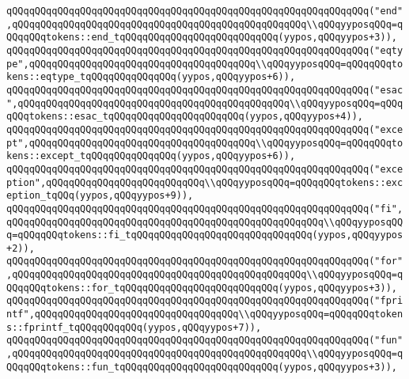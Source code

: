\verb|qQQqqQQqqQQqqQQqqQQqqQQqqQQqqQQqqQQqqQQqqQQqqQQqqQQqqQQqqQQqqQQq("end",qQQqqQQqqQQqqQQqqQQqqQQqqQQqqQQqqQQqqQQqqQQqqQQqqQQq\\qQQqyyposqQQq=qQQqqQQqtokens::end_tqQQqqQQqqQQqqQQqqQQqqQQqqQQq(yypos,qQQqyypos+3)),|\newline
\verb|qQQqqQQqqQQqqQQqqQQqqQQqqQQqqQQqqQQqqQQqqQQqqQQqqQQqqQQqqQQqqQQq("eqtype",qQQqqQQqqQQqqQQqqQQqqQQqqQQqqQQqqQQqqQQq\\qQQqyyposqQQq=qQQqqQQqtokens::eqtype_tqQQqqQQqqQQqqQQq(yypos,qQQqyypos+6)),|\newline
\verb|qQQqqQQqqQQqqQQqqQQqqQQqqQQqqQQqqQQqqQQqqQQqqQQqqQQqqQQqqQQqqQQq("esac",qQQqqQQqqQQqqQQqqQQqqQQqqQQqqQQqqQQqqQQqqQQqqQQq\\qQQqyyposqQQq=qQQqqQQqtokens::esac_tqQQqqQQqqQQqqQQqqQQqqQQq(yypos,qQQqyypos+4)),|\newline
\verb|qQQqqQQqqQQqqQQqqQQqqQQqqQQqqQQqqQQqqQQqqQQqqQQqqQQqqQQqqQQqqQQq("except",qQQqqQQqqQQqqQQqqQQqqQQqqQQqqQQqqQQqqQQq\\qQQqyyposqQQq=qQQqqQQqtokens::except_tqQQqqQQqqQQqqQQq(yypos,qQQqyypos+6)),|\newline
\verb|qQQqqQQqqQQqqQQqqQQqqQQqqQQqqQQqqQQqqQQqqQQqqQQqqQQqqQQqqQQqqQQq("exception",qQQqqQQqqQQqqQQqqQQqqQQqqQQq\\qQQqyyposqQQq=qQQqqQQqtokens::exception_tqQQq(yypos,qQQqyypos+9)),|\newline
\verb|qQQqqQQqqQQqqQQqqQQqqQQqqQQqqQQqqQQqqQQqqQQqqQQqqQQqqQQqqQQqqQQq("fi",qQQqqQQqqQQqqQQqqQQqqQQqqQQqqQQqqQQqqQQqqQQqqQQqqQQqqQQq\\qQQqyyposqQQq=qQQqqQQqtokens::fi_tqQQqqQQqqQQqqQQqqQQqqQQqqQQqqQQq(yypos,qQQqyypos+2)),|\newline
\verb|qQQqqQQqqQQqqQQqqQQqqQQqqQQqqQQqqQQqqQQqqQQqqQQqqQQqqQQqqQQqqQQq("for",qQQqqQQqqQQqqQQqqQQqqQQqqQQqqQQqqQQqqQQqqQQqqQQqqQQq\\qQQqyyposqQQq=qQQqqQQqtokens::for_tqQQqqQQqqQQqqQQqqQQqqQQqqQQq(yypos,qQQqyypos+3)),|\newline
\verb|qQQqqQQqqQQqqQQqqQQqqQQqqQQqqQQqqQQqqQQqqQQqqQQqqQQqqQQqqQQqqQQq("fprintf",qQQqqQQqqQQqqQQqqQQqqQQqqQQqqQQqqQQq\\qQQqyyposqQQq=qQQqqQQqtokens::fprintf_tqQQqqQQqqQQq(yypos,qQQqyypos+7)),|\newline
\verb|qQQqqQQqqQQqqQQqqQQqqQQqqQQqqQQqqQQqqQQqqQQqqQQqqQQqqQQqqQQqqQQq("fun",qQQqqQQqqQQqqQQqqQQqqQQqqQQqqQQqqQQqqQQqqQQqqQQqqQQq\\qQQqyyposqQQq=qQQqqQQqtokens::fun_tqQQqqQQqqQQqqQQqqQQqqQQqqQQq(yypos,qQQqyypos+3)),|\newline

